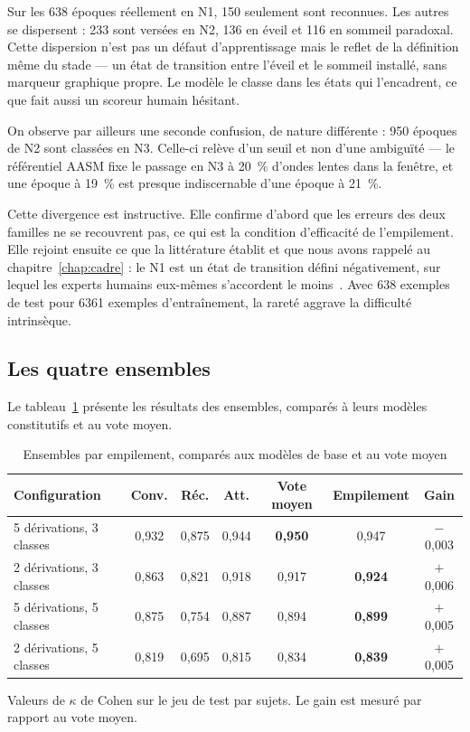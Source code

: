 Sur les \num{638} époques réellement en N1, \num{150} seulement sont reconnues. Les
autres se dispersent : \num{233} sont versées en N2, \num{136} en éveil et \num{116}
en sommeil paradoxal. Cette dispersion n'est pas un défaut d'apprentissage mais le
reflet de la définition même du stade — un état de transition entre l'éveil et le
sommeil installé, sans marqueur graphique propre. Le modèle le classe dans les états
qui l'encadrent, ce que fait aussi un scoreur humain hésitant.

On observe par ailleurs une seconde confusion, de nature différente : \num{950} époques
de N2 sont classées en N3. Celle-ci relève d'un seuil et non d'une ambiguïté — le
référentiel AASM fixe le passage en N3 à \SI{20}{\percent} d'ondes lentes dans la
fenêtre, et une époque à \SI{19}{\percent} est presque indiscernable d'une époque à
\SI{21}{\percent}.

Cette divergence est instructive. Elle confirme d'abord que les erreurs des deux
familles ne se recouvrent pas, ce qui est la condition d'efficacité de l'empilement.
Elle rejoint ensuite ce que la littérature établit et que nous avons rappelé au
chapitre~\ref{chap:cadre} : le N1 est un état de transition défini négativement, sur
lequel les experts humains eux-mêmes s'accordent le moins~\cite{rosenberg2013}. Avec
\num{638} exemples de test pour \num{6361} exemples d'entraînement, la rareté aggrave
la difficulté intrinsèque.

\subsection{Les quatre ensembles}

Le tableau~\ref{tab:ensembles} présente les résultats des ensembles, comparés à leurs
modèles constitutifs et au vote moyen.

\begin{table}[H]
\centering
\caption{Ensembles par empilement, comparés aux modèles de base et au vote moyen}
\label{tab:ensembles}
\small
\begin{tabular}{@{}lcccccc@{}}
\toprule
\textbf{Configuration} & \textbf{Conv.} & \textbf{Réc.} & \textbf{Att.} &
\textbf{Vote moyen} & \textbf{Empilement} & \textbf{Gain} \\
\midrule
5 dérivations, 3 classes & 0,932 & 0,875 & 0,944 & \textbf{0,950} & 0,947 &
\textcolor{hypnored}{$-$0,003} \\
2 dérivations, 3 classes & 0,863 & 0,821 & 0,918 & 0,917 & \textbf{0,924} & $+$0,006 \\
5 dérivations, 5 classes & 0,875 & 0,754 & 0,887 & 0,894 & \textbf{0,899} & $+$0,005 \\
2 dérivations, 5 classes & 0,819 & 0,695 & 0,815 & 0,834 & \textbf{0,839} & $+$0,005 \\
\bottomrule
\end{tabular}
\vspace{2pt}
\raggedright\footnotesize
Valeurs de $\kappa$ de Cohen sur le jeu de test par sujets. Le gain est mesuré par
rapport au vote moyen.
\end{table}

